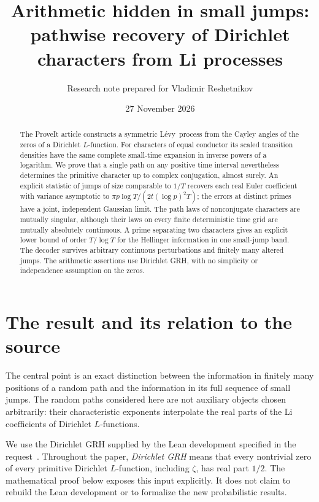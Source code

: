 \documentclass[11pt]{article}
\title{Arithmetic hidden in small jumps:\\
pathwise recovery of Dirichlet characters from Li processes}
\author{Research note prepared for Vladimir Reshetnikov}
\date{27 November 2026}
\theoremstyle{definition}
\newcommand{\Levy}{L\'evy}
\begin{document}
\maketitle

\begin{abstract}
The ProveIt article constructs a symmetric \Levy\ process from the Cayley angles
of the zeros of a Dirichlet $L$-function. For characters of equal conductor its
scaled transition densities have the same complete small-time expansion in
inverse powers of a logarithm. We prove that a single path on any positive time
interval nevertheless determines the primitive character up to complex
conjugation, almost surely. An explicit statistic of jumps of size comparable to
$1/T$ recovers each real Euler coefficient with variance asymptotic to
$\pi p\log T/(2t(\log p)^2T)$; the errors at distinct primes have a joint,
independent Gaussian limit. The path laws of nonconjugate characters are mutually
singular, although their laws on every finite deterministic time grid are
mutually absolutely continuous. A prime separating two characters gives an
explicit lower bound of order $T/\log T$ for the Hellinger information in one
small-jump band. The decoder survives arbitrary continuous perturbations and
finitely many altered jumps. The arithmetic assertions use Dirichlet GRH, with
no simplicity or independence assumption on the zeros.
\end{abstract}

\tableofcontents

\section{The result and its relation to the source}

The central point is an exact distinction between the information in finitely
many positions of a random path and the information in its full sequence of
small jumps. The random paths considered here are not auxiliary objects chosen
arbitrarily: their characteristic exponents interpolate the real parts of the
Li coefficients of Dirichlet $L$-functions.

We use the Dirichlet GRH supplied by the Lean development specified in the
request~\cite{LeanSource}. Throughout the paper, \emph{Dirichlet GRH} means that every nontrivial
zero of every primitive Dirichlet $L$-function, including $\zeta$, has real part
$1/2$. The mathematical proof below exposes this input explicitly. It does not
claim to rebuild the Lean development or to formalize the new probabilistic
results.
\end{document}
